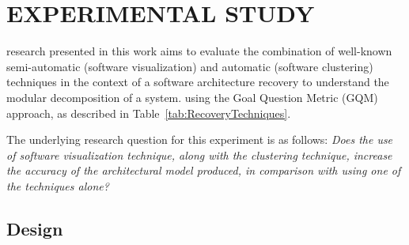 \section{EXPERIMENTAL STUDY}\label{sec:experiment}

  research presented in this work  aims to evaluate the combination
of well-known semi-automatic (software visualization) and automatic (software clustering) techniques in the context of a software architecture recovery to understand the modular decomposition of a system.  using the Goal Question Metric (GQM) approach, as described in Table~\ref{tab:RecoveryTechniques}.
\begin{table}[!h]
	\centering
	\caption{Definition of the accuracy evaluation Software Architecture Recovery Techniques.}
	\label{tab:RecoveryTechniques}
\end{table}
The underlying research question for this experiment is as follows: 
\emph{Does the use of software visualization technique, along with the clustering technique, increase the accuracy of the architectural model produced, in comparison with using one of the techniques alone?}
  
\subsection{Design}%



